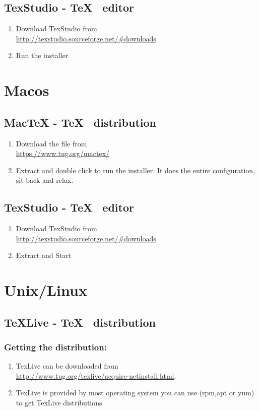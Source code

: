 \subsection*{TexStudio - \TeX~ editor}
\begin{enumerate}
\item	Download TexStudio from\\
\href{http://texstudio.sourceforge.net/\#downloads}
{http://texstudio.sourceforge.net/\#downloads} 
\item	Run the installer
\end{enumerate}

\section*{Macos}
\subsection*{MacTeX - \TeX~ distribution}
\begin{enumerate}
\item	Download the file from\\
\href{https://www.tug.org/mactex/}{https://www.tug.org/mactex/}
\item	Extract and double click to run the installer. It does the entire configuration, sit back and relax.
\end{enumerate}

\subsection*{TexStudio - \TeX~ editor}
\begin{enumerate}
\item	Download TexStudio from\\
\href{http://texstudio.sourceforge.net/\#downloads}
{http://texstudio.sourceforge.net/\#downloads} 
\item	Extract and Start
\end{enumerate}


\section*{Unix/Linux}
\subsection*{TeXLive - \TeX~ distribution}
\subsubsection*{Getting the distribution:}
\begin{enumerate}
\item	TexLive can be downloaded from\\
\href{http://www.tug.org/texlive/acquire-netinstall.html}
{http://www.tug.org/texlive/acquire-netinstall.html}.
\item	TexLive is provided by most operating system you can use (rpm,apt or yum) to get TexLive distributions
\end{enumerate}

